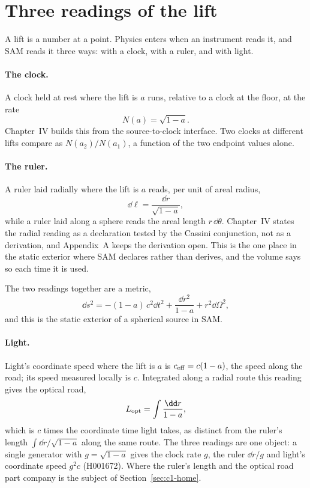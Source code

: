 \section{Three readings of the lift}
\label{sec:c1-readings}

A lift is a number at a point. Physics enters when an instrument reads it, and SAM reads it three ways: with a clock, with a ruler, and with light.

\paragraph{The clock.} A clock held at rest where the lift is $a$ runs, relative to a clock at the floor, at the rate
\begin{equation}
N(a)=\sqrt{1-a}.
\label{eq:c1-clock}
\end{equation}
Chapter~IV builds this from the source-to-clock interface. Two clocks at different lifts compare as $N(a_2)/N(a_1)$, a function of the two endpoint values alone.

\paragraph{The ruler.} A ruler laid radially where the lift is $a$ reads, per unit of areal radius,
\begin{equation}
\dd\ell=\frac{\dd r}{\sqrt{1-a}},
\label{eq:c1-ruler}
\end{equation}
while a ruler laid along a sphere reads the areal length $r\,\dd\theta$. Chapter~IV states the radial reading as a declaration tested by the Cassini conjunction, not as a derivation, and Appendix~A keeps the derivation open. This is the one place in the static exterior where SAM declares rather than derives, and the volume says so each time it is used.

The two readings together are a metric,
\begin{equation}
\dd s^2=-(1-a)\,c^2\dd t^2+\frac{\dd r^2}{1-a}+r^2\dd\Omega^2,
\label{eq:c1-metric}
\end{equation}
and this is the static exterior of a spherical source in SAM.

\paragraph{Light.} Light's coordinate speed where the lift is $a$ is $c_{\rm eff}=c(1-a)$, the speed along the road; its speed measured locally is $c$. Integrated along a radial route this reading gives the optical road,
\begin{equation}
L_{\rm opt}=\int\frac{\dd r}{1-a},
\label{eq:c1-optical-road}
\end{equation}
which is $c$ times the coordinate time light takes, as distinct from the ruler's length $\int\dd r/\sqrt{1-a}$ along the same route. The three readings are one object: a single generator with $g=\sqrt{1-a}$ gives the clock rate $g$, the ruler $\dd r/g$ and light's coordinate speed $g^2c$ (H001672). Where the ruler's length and the optical road part company is the subject of Section~\ref{sec:c1-home}.

